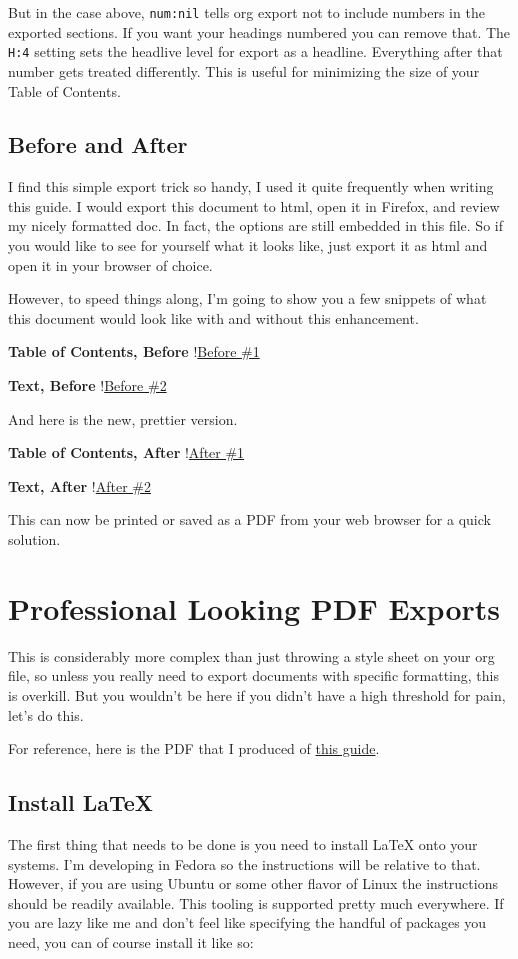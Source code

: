 \documentclass[11pt]{article}
\begin{document}
But in the case above, \texttt{num:nil} tells org export not to include numbers in the exported sections. If you want your headings numbered you can remove that. The \texttt{H:4} setting sets the headlive level for export as a headline. Everything after that number gets treated differently. This is useful for minimizing the size of your Table of Contents.
\subsection*{Before and After}
\label{sec:org7f7ef53}
I find this simple export trick so handy, I used it quite frequently when writing this guide. I would export this document to html, open it in Firefox, and review my nicely formatted doc. In fact, the options are still embedded in this file. So if you would like to see for yourself what it looks like, just export it as html and open it in your browser of choice.

However, to speed things along, I'm going to show you a few snippets of what this document would look like with and without this enhancement.

\textbf{Table of Contents, Before}
!\href{images/before-pretty-css.png}{Before \#1}

\textbf{Text, Before}
!\href{images/before-example-2.png}{Before \#2}

And here is the new, prettier version.

\textbf{Table of Contents, After}
!\href{images/after-pretty-css.png}{After \#1}

\textbf{Text, After}
!\href{images/after-example-2.png}{After \#2}

This can now be printed or saved as a PDF from your web browser for a quick solution.
\section*{Professional Looking PDF Exports}
\label{sec:orgf24826d}
This is considerably more complex than just throwing a style sheet on your org file, so unless you really need to export documents with specific formatting, this is overkill. But you wouldn't be here if you didn't have a high threshold for pain, let's do this.

For reference, here is the PDF that I produced of \href{README.pdf}{this guide}.
\subsection*{Install \LaTeX{}}
\label{sec:org349accd}
The first thing that needs to be done is you need to install \LaTeX{} onto your systems. I'm developing in Fedora so the instructions will be relative to that. However, if you are using Ubuntu or some other flavor of Linux the instructions should be readily available. This tooling is supported pretty much everywhere. If you are lazy like me and don't feel like specifying the handful of packages you need, you can of course install it like so:
\end{document}
